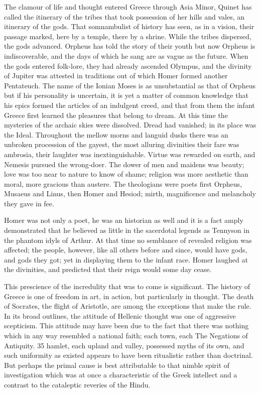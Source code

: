 \documentclass[]{book}
\begin{document}
The clamour of life and thought entered Greece through Asia Minor,
Quinet has called the itinerary of the tribes that took possession of
her hills and vales, an itinerary of the gods. That somnambulist of
history has seen, as in a vision, their passage marked, here by a
temple, there by a shrine. While the tribes dispersed, the gods
advanced. Orpheus has told the story of their youth but now Orpheus is
indiscoverable, and the days of which he sang are as vague as the
future. When the gods entered folk-lore, they had already ascended
Olympus, and the divinity of Jupiter was attested in traditions out of
which Homer formed another Pentateuch. The name of the Ionian Moses is
as unsubstantial as that of Orpheus but if his personality is uncertain,
it is yet a matter of common knowledge that his epics formed the
articles of an indulgent creed, and that from them the infant Greece
first learned the pleasures that belong to dream. At this time the
mysteries of the archaic skies were dissolved. Dread had vanished; in
its place was the Ideal. Throughout the mellow morns and languid dusks
there was an unbroken procession of the gayest, the most alluring
divinities their fare was ambrosia, their laughter was inextinguishable.
Virtue was rewarded on earth, and Nemesis pursued the wrong-doer. The
dower of men and maidens was beauty; love was too near to nature to know
of shame; religion was more aesthetic than moral, more gracious than
austere. The theologians were poets first Orpheus, Musaeus and Linus,
then Homer and Hesiod; mirth, magnificence and melancholy they gave in
fee.

Homer was not only a poet, he was an historian as well and it is a fact
amply demonstrated that he believed as little in the sacerdotal legends
as Tennyson in the phantom idyls of Arthur. At that time no semblance of
revealed religion was affected; the people, however, like all others
before and since, would have gods, and gods they got; yet in displaying
them to the infant race. Homer laughed at the divinities, and predicted
that their reign would some day cease.

This prescience of the incredulity that was to come is significant. The
history of Greece is one of freedom in art, in action, but particularly
in thought. The death of Socrates, the flight of Aristotle, are among
the exceptions that make the rule. In its broad outlines, the attitude
of Hellenic thought was one of aggressive scepticism. This attitude may
have been due to the fact that there was nothing which in any way
resembled a national faith; each town, each The Negations of Antiquity.
35 hamlet, each upland and valley, possessed myths of its own, and such
uniformity as existed appears to have been ritualistic rather than
doctrinal. But perhaps the primal cause is best attributable to that
nimble spirit of investigation which was at once a characteristic of the
Greek intellect and a contrast to the cataleptic reveries of the Hindu.
\end{document}
